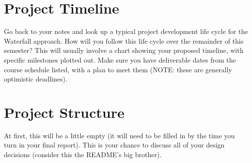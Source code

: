 \documentclass[10pt,conference,onecolumn,compsoc]{IEEEtran}
\begin{document}
\section{Project Timeline}
Go back to your notes and look up a typical project development life cycle for the Waterfall approach.  How will you follow this life cycle over the remainder of this semester?  This will usually involve a chart showing your proposed timeline, with specific milestones plotted out.  Make sure you have deliverable dates from the course schedule listed, with a plan to meet them (NOTE: these are generally optimistic deadlines).

\section{Project Structure}
At first, this will be a little empty (it will need to be filled in by the time you turn in your final report).  This is your chance to discuss all of your design decisions (consider this the README's big brother).
\end{document}
